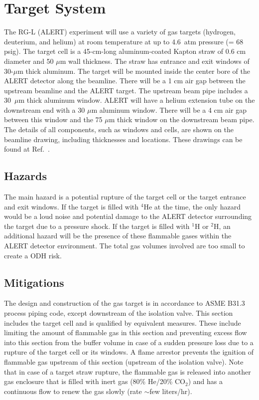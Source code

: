 \section{Target System}

The RG-L (ALERT) experiment will use a variety of gas targets (hydrogen, deuterium, and helium) at
room temperature at up to 4.6~atm pressure (= 68 psig). The target cell is a
45-cm-long aluminum-coated Kapton straw of 0.6 cm diameter and 50 $\mu$m wall thickness. The
straw has entrance and exit windows of 30-$\mu$m thick aluminum. The target will be mounted
inside the center bore of the ALERT detector along the beamline. There will be a 1 cm air gap
between the upstream beamline and the ALERT target. The upstream beam pipe includes a 30~$\mu$m
thick aluminum window. ALERT will have a helium extension tube on the downstream end with a
30 $\mu$m aluminum window. There will be a 4 cm air gap between this window and the 75 $\mu$m
thick window on the downstream beam pipe. The details of all components, such as windows and cells,
are shown on the beamline drawing, including thicknesses and locations. These drawings can be found
at Ref.~\cite{engineering-page}.

\subsection{Hazards} 

The main hazard is a potential rupture of the target cell or the target entrance and exit windows.
If the target is filled with $^4$He at the time, the only hazard would be a loud noise and potential
damage to the ALERT detector surrounding the target due to a pressure shock. If the target is filled
with $^1$H or $^2$H, an additional hazard will be the presence of these flammable gases within the
ALERT detector environment. The total gas volumes involved are too small to create a ODH risk.

\subsection{Mitigations}

The design and construction of the gas target is in accordance to ASME B31.3 process piping code, except
downstream of the isolation valve. This section includes the target cell and is qualified by equivalent
measures. These include limiting the amount of flammable gas in this section and preventing excess flow
into this section from the buffer volume in case of a sudden pressure loss due to a rupture of the target
cell or its windows. A flame arrestor prevents the ignition of flammable gas upstream of this section
(upstream of the isolation valve). Note that in case of a target straw rupture, the flammable gas is
released into another gas enclosure that is filled with inert gas (80\% He/20\% CO$_2$) and has a
continuous flow to renew the gas slowly (rate $\sim$few liters/hr).

